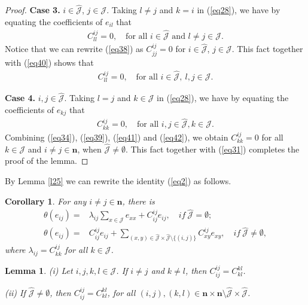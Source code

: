 \documentclass[reqno]{amsart}
\theoremstyle{plain}
\newtheorem{lemma}[theorem]{Lemma}
\newtheorem{corollary}[theorem]{Corollary}
\theoremstyle{definition}
\begin{document}
\begin{proof}
\textbf{Case 3.} $i \in \hat{\mathcal{J}}$, $j \in \mathcal{J}$. Taking 
$l \neq j$ and $k=i$ in (\ref{eq28}), we have
by equating the coefficients of $e_{il}$ that
 \begin{align}\label{eq40}
C_{ll}^{ij} = 0, \quad \text{for all } i \in \hat{\mathcal{J}} \text{ and } l \neq j \in \mathcal{J}.
 \end{align}
Notice that we can rewrite (\ref{eq38}) as $C_{jj}^{ij}=0$ for $i \in \hat{\mathcal{J}}$, $j \in \mathcal{J}$.
This fact together with (\ref{eq40}) shows that
 \begin{align}\label{eq41}
C_{ll}^{ij} = 0, \quad \text{for all } i \in \hat{\mathcal{J}},~ l, j \in \mathcal{J}.
 \end{align}

\textbf{Case 4.} $i, j \in \hat{\mathcal{J}}$. Taking $l=j$ and $k \in \mathcal{J}$ in (\ref{eq28}), we have
by equating the coefficients of $e_{kj}$ that
 \begin{align}\label{eq42}
C_{kk}^{ij} = 0, \quad \text{for all } i, j \in \hat{\mathcal{J}}, k \in \mathcal{J}.
 \end{align}
Combining (\ref{eq34}), (\ref{eq39}), (\ref{eq41}) and (\ref{eq42}), we obtain $C_{kk}^{ij} = 0$ for all $k \in \mathcal{J}$ and $i\neq j \in \mathbf{n}$, when $\hat{\mathcal{J}} \neq \emptyset$. This fact together with (\ref{eq31}) completes the proof of the lemma.
\end{proof}

By Lemma \ref{l25} we can rewrite the identity (\ref{eq2})
as follows.

\begin{corollary}\label{l26}
For any $i \neq j\in \mathbf{n}$, there is 
\[
\begin{aligned}
\theta(e_{ij}) =& \lambda_{ij} \sum_{x \in \mathcal{J}} e_{xx} + C_{ij}^{ij} e_{ij},
\quad if\ \hat{\mathcal{J}} = \emptyset;\\
\theta(e_{ij}) =& C_{ij}^{ij} e_{ij} + \sum_{(x, y) \in \hat{\mathcal{J}}\times \hat{\mathcal{J}}\setminus \{(i,j)\}} C_{xy}^{ij} e_{xy},
\quad if\ \hat{\mathcal{J}} \neq \emptyset,
\end{aligned}
\]
where $\lambda_{ij}=C_{kk}^{ij}$ for all $k\in \mathcal{J}$.
\end{corollary}

\begin{lemma}\label{l27}
(i) Let $i,j,k,l\in \mathcal{J} $. If $ i \neq j $ and $ k \neq l $, then $C_{ij}^{ij} = C_{kl}^{kl} $.

(ii) If $ \hat{\mathcal{J}} \neq \emptyset $, then
$ C_{ij}^{ij} = C_{kl}^{kl} $, for all $ (i,j), (k,l) \in \mathbf{n} \times \mathbf{n} \setminus \hat{\mathcal{J}} \times \hat{\mathcal{J}} $.
\end{lemma}
\end{document}
